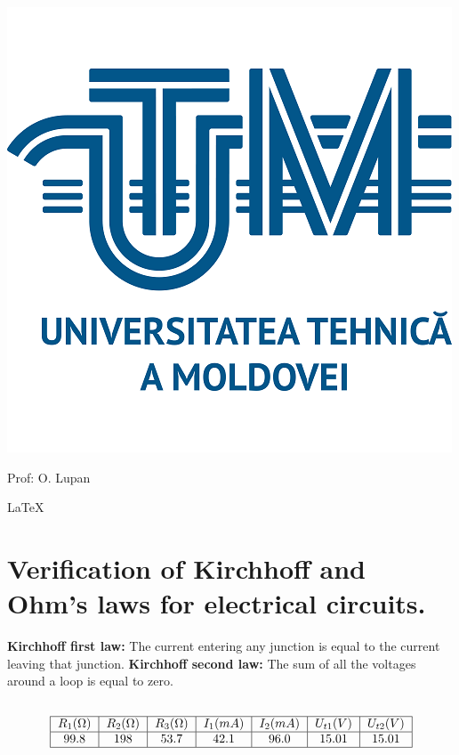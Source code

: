 \documentclass{article}
\begin{document}
	\centering
	\includegraphics{imgs/UTM_logo.png}

	\begin{flushright}
		Prof: O. Lupan
	\end{flushright}

	\LaTeX
	\pagebreak %

	\raggedright
	\section{Verification of Kirchhoff and Ohm's laws for electrical circuits.}
		\textbf{Kirchhoff first law:} The current entering any junction is equal to the current leaving that junction.
		\textbf{Kirchhoff second law:} The sum of all the voltages around a loop is equal to zero.


		\subsection{}
			\[
				\begin{tabular}{|c|c|c|c|c|c|c|c|}
					\hline
					$R_1 (\Omega)$ & $R_2 (\Omega)$ & $R_3 (\Omega)$ & $I_1 (mA)$ & $I_2 (mA)$ & $U_{t1} (V)$ & $U_{t2} (V)$\\
					\hline
					\ROne & \RTwo & \RThree & \IPosOne & \IPosTwo& 15.01 & 15.01\\
					\hline
				\end{tabular}
			\]
\end{document}
